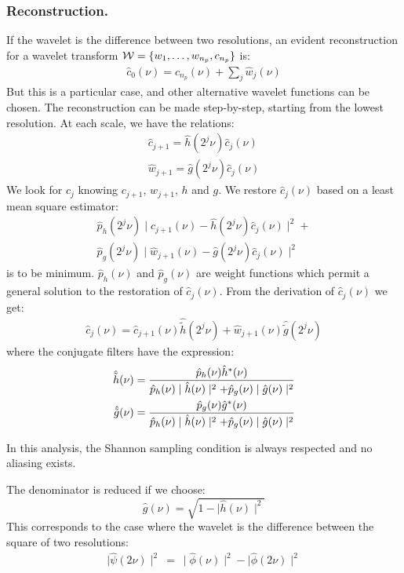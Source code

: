 \documentclass[11pt,a4paper]{article}
\begin{document}
\subsubsection*{Reconstruction.}
If the wavelet is the difference between two resolutions,
an evident reconstruction for a wavelet transform 
${\cal W} = \{w_1,\dots, w_{n_p}, c_{n_p}\}$ is:
\begin{eqnarray}
\hat c_0(\nu) = \hat c_{n_p}(\nu) + \sum_j \hat w_j(\nu)
\end{eqnarray}
But this is a particular case, and other alternative wavelet functions can be
chosen. The reconstruction can be made step-by-step, starting from
the lowest resolution. At each scale, we have the relations:
\begin{eqnarray}
\hat c_{j+1} = \hat h(2^j \nu) \hat c_j(\nu) \\
\hat w_{j+1} = \hat g(2^j \nu) \hat c_j(\nu) 
\end{eqnarray}
We look for $c_j$ knowing $c_{j+1}$, $w_{j+1}$, $h$ and $g$.
We restore $\hat c_j(\nu)$ based on a least mean square estimator:
\begin{eqnarray}
\hat p_h(2^j\nu) \mid \hat c_{j+1}(\nu)-\hat h(2^j\nu)\hat c_j(\nu) \mid^2 + 
\nonumber \\
\hat p_g(2^j\nu) \mid \hat w_{j+1}(\nu)-\hat g(2^j\nu)\hat c_j(\nu) \mid^2
\end{eqnarray}
is to be minimum. $\hat p_h(\nu)$ and $\hat p_g(\nu)$ are weight
functions which permit a general solution to the
restoration of $\hat c_j(\nu)$. From the derivation of $\hat c_j(\nu)$  we get:
\begin{eqnarray}
\hat{c}_{j}(\nu)=\hat{c}_{j+1}(\nu) \hat{\tilde h}(2^{j}\nu)
                +\hat{w}_{j+1}(\nu) \hat{\tilde g}(2^{j}\nu)
\label{restauration}
\end{eqnarray} 
where the conjugate filters have the expression:
\begin{eqnarray}
\hat{\tilde h}(\nu) & = {\hat{p}_h(\nu) \hat{h}^*(\nu)\over \hat{p}_h(\nu)
\mid \hat{h}(\nu)\mid^2 + \hat{p}_g(\nu)\mid \hat{g}(\nu)\mid^2} \label{eqnht} \\ 
\hat{\tilde g}(\nu) & = {\hat{p}_g(\nu) \hat{g}^*(\nu)\over \hat p_h(\nu)
\mid \hat{h}(\nu)\mid^2 + \hat{p}_g(\nu)\mid \hat{g}(\nu)\mid^2}
\label{eqngt}
\end{eqnarray}

In this analysis, the
Shannon sampling condition is always respected and no aliasing
exists.

The denominator is reduced if we choose:
\[\hat{g}(\nu) = \sqrt{1 - \mid\hat{h}(\nu)\mid^2}\]
This corresponds to the case where the wavelet is the difference between
the square of two resolutions:
\begin{eqnarray}
\mid \hat \psi(2\nu)\mid^2  \ = \ \mid \hat \phi(\nu)\mid^2  - \mid  \hat
\phi(2\nu)\mid^2 
\end{eqnarray}
\end{document}
